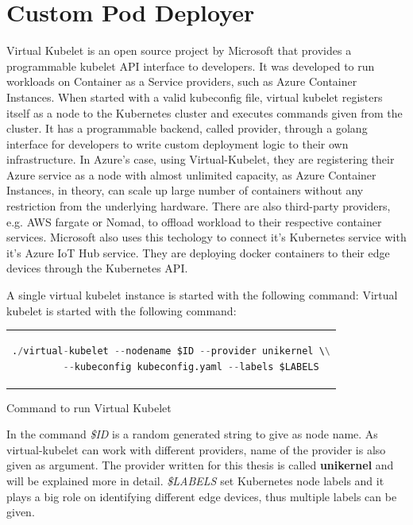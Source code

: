 \section{Custom Pod Deployer}
Virtual Kubelet\cite{virtual} is an open source project by Microsoft that provides a programmable kubelet API interface to developers. It was developed to run workloads on Container as a Service providers, such as Azure Container Instances. When started with a valid kubeconfig file, virtual kubelet registers itself as a node to the Kubernetes cluster and executes commands given from the cluster. It has a programmable backend, called provider, through a golang interface for developers to write custom deployment logic to their own infrastructure. In Azure's case, using Virtual-Kubelet, they are registering their Azure service as a node with almost unlimited capacity, as Azure Container Instances, in theory, can scale up large number of containers without any restriction from the underlying hardware. There are also third-party providers, e.g. AWS fargate or Nomad, to offload workload to their respective container services. Microsoft also uses this techology to connect it's Kubernetes service with it's Azure IoT Hub service.\cite{Chandra2019} They are deploying docker containers to their edge devices through the Kubernetes API. 

A single virtual kubelet instance is started with the following command:
Virtual kubelet is started with the following command:
\begin{code}[htpb]
  \centering
  \begin{tabular}{c}
    \begin{lstlisting}[language=python]
      ./virtual-kubelet --nodename $ID --provider unikernel \\
       --kubeconfig kubeconfig.yaml --labels $LABELS
      \end{lstlisting}
\end{tabular}
\caption{Command to run Virtual Kubelet}\label{lst:vkcommand}
\end{code}


In the command \textit{\$ID} is a random generated string to give as node name. As virtual-kubelet can work with different providers, name of the provider is also given as argument. The provider written for this thesis is called \textbf{unikernel} and will be explained more in detail. \textit{\$LABELS} set Kubernetes node labels and it plays a big role on identifying different edge devices, thus multiple labels can be given.

